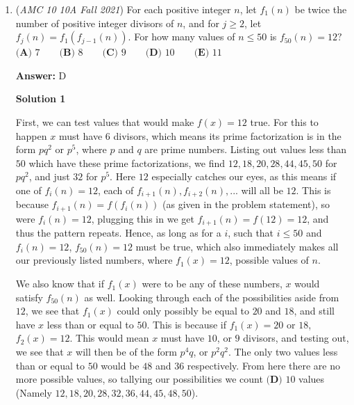 \begin{enumerate}
We will use coordinates. WLOG, let the coordinates of the center of the base of the cone be the origin. Then, let the center of one of the spheres be $\left(0, \frac{2r}{\sqrt{3}}, r\right)$. Note that the distance between this point and the plane given by $12y+5z=60$ is $r$. Thus, by the point-to-plane distance formula, we have
 \[\frac{\left|12 \cdot \frac{2r}{\sqrt{3}} + 5r - 60\right|}{\sqrt{0^2+5^2+12^2}}=r.\]Solving for $r$ yields $r = \boxed{\textbf{(B)}\ \frac{90-40\sqrt{3}}{11}}$.

 



\textbf{Solution 4 (Very Cheesy and Risky)}

Clearly the answer must have square roots, leaving $\textbf{(B)}$ and $\textbf{(D)}.$ D has a lot of perfect squares, so we suspect it is a trap. This leads us to choose $\textbf{(B)}$.

 


	\item (\textit{AMC 10 10A Fall 2021}) For each positive integer $n$, let $f_1(n)$ be twice the number of positive integer divisors of $n$, and for $j \ge 2$, let $f_j(n) = f_1(f_{j-1}(n))$. For how many values of $n \le 50$ is $f_{50}(n) = 12?$
$\textbf{(A) }7\qquad\textbf{(B) }8\qquad\textbf{(C) }9\qquad\textbf{(D) }10\qquad\textbf{(E) }11$

 \textbf{Answer: }D



\textbf{Solution 1}

First, we can test values that would make $f(x)=12$ true. For this to happen $x$ must have $6$ divisors, which means its prime factorization is in the form $pq^2$ or $p^5$, where $p$ and $q$ are prime numbers. Listing out values less than $50$ which have these prime factorizations, we find $12,18,20,28,44,45,50$ for $pq^2$, and just $32$ for $p^5$. Here $12$ especially catches our eyes, as this means if one of $f_i(n)=12$, each of $f_{i+1}(n), f_{i+2}(n), ...$ will all be $12$. This is because $f_{i+1}(n)=f(f_i(n))$ (as given in the problem statement), so were $f_i(n)=12$, plugging this in we get $f_{i+1}(n)=f(12)=12$, and thus the pattern repeats. Hence, as long as for a $i$, such that $i\leq 50$ and $f_{i}(n)=12$, $f_{50}(n)=12$ must be true, which also immediately makes all our previously listed numbers, where $f_1(x)=12$, possible values of $n$.

 We also know that if $f_1(x)$ were to be any of these numbers, $x$ would satisfy $f_{50}(n)$ as well. Looking through each of the possibilities aside from $12$, we see that $f_1(x)$ could only possibly be equal to $20$ and $18$, and still have $x$ less than or equal to $50$. This is because if $f_1(x)=20$ or $18$, $f_2 (x) = 12$. This would mean $x$ must have $10$, or $9$ divisors, and testing out, we see that $x$ will then be of the form $p^4q$, or $p^2q^2$. The only two values less than or equal to $50$ would be $48$ and $36$ respectively. From here there are no more possible values, so tallying our possibilities we count $\boxed{\textbf{(D) }10}$ values (Namely $12,18,20,28,32,36,44,45,48,50$).


\end{enumerate}
